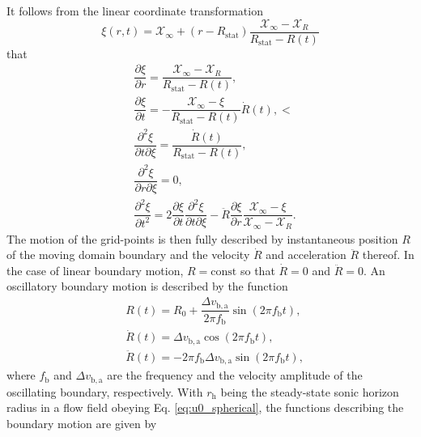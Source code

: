 It follows from the linear coordinate transformation
\begin{equation}
\xi\left(r,t\right) = \mathcal{X}_{\infty} + \left(r - R_{\mathrm{stat}}\right) \dfrac{\mathcal{X}_{\mathrm{\infty}} - \mathcal{X}_{R}}{R_{\mathrm{stat}}-R\left(t\right)}
\label{eq:linTrans}
\end{equation}
that
\begin{align}
& \dfrac{\partial \xi}{\partial r} = \dfrac{\mathcal{X}_{\mathrm{\infty}} - \mathcal{X}_{R}}{R_{\mathrm{stat}}-R\left(t\right)},
\label{eq:linJacobian} \\[4pt]
& \dfrac{\partial \xi}{\partial t} =
-\dfrac{\mathcal{X}_{\mathrm{\infty}} - \xi}{R_{\mathrm{stat}} - R\left(t\right)} \dot R\left(t\right),<
\label{eq:linq}
\\[4pt]
& \dfrac{\partial^2 \xi}{\partial t \partial \xi} = \dfrac{\dot R\left(t\right)}{R_{\mathrm{stat}} - R\left(t\right)},
\label{eq:lindivq} \\[4pt]
& \dfrac{\partial^2 \xi}{\partial r \partial \xi} = 0,
\label{eq:linJacobiandxi} \\[4pt]
& \dfrac{\partial^2 \xi}{\partial t^2} = 2\dfrac{\partial \xi}{\partial t}\dfrac{\partial^2\xi}{\partial t\partial \xi} - \ddot R\dfrac{\partial \xi}{\partial r} \dfrac{\mathcal{X}_{\infty} - \xi}{\mathcal{X}_{\infty} - \mathcal{X}_{R}}.
\label{eq:lindqdt}
\end{align}
The motion of the grid-points is then fully described by instantaneous position $R$ of the moving domain boundary and the velocity $\dot R$ and acceleration $\ddot R$ thereof. In the case of linear boundary motion, $R=\mathrm{const}$ so that $\dot R=0$ and $\ddot R=0$. An oscillatory boundary motion is described by the function
\begin{align}
& R\left(t\right) = R_0 + \dfrac{\Delta v_{\mathrm{b,a}}}{2\pi f_{\mathrm{b}}}\sin\left(2\pi f_{\mathrm{b}}t\right)
\label{eq:oscillatingBoundary_R}, \\[4pt]
& \dot R\left(t\right) = \Delta v_{\mathrm{b,a}}\cos\left(2\pi f_{\mathrm{b}}t\right)
\label{eq:oscillatingBoundary_dotR}, \\[4pt]
& \ddot R\left(t\right) = -2\pi f_{\mathrm{b}}\Delta v_{\mathrm{b,a}}\sin\left(2\pi f_{\mathrm{b}}t\right)
\label{eq:oscillatingBoundary_ddotR},
\end{align}
where $f_{\mathrm{b}}$ and $\Delta v_{\mathrm{b,a}}$ are the frequency and the velocity amplitude of the oscillating boundary, respectively. With $r_{\mathrm{h}}$ being the steady-state sonic horizon radius in a flow field obeying Eq. \eqref{eq:u0_spherical}, the functions describing the boundary motion are given by
